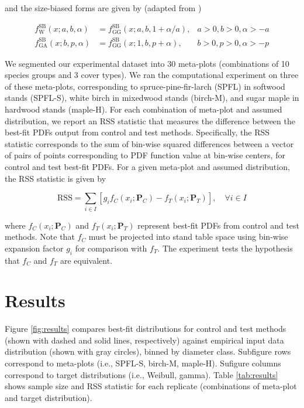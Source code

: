 \documentclass{foresj}
\begin{document}
and the size-biased forms are given by (adapted from \citealp{ducey2015sizebiased})

\begin{align}
f^{\text{SB}}_{\text{W}}(x; a, b, \alpha) &= f^{\text{SB}}_{\text{GG}}(x; a, b, 1 + \alpha/a),& a > 0, b > 0, \alpha > -a \\
f^{\text{SB}}_{\text{GA}}(x; b, p, \alpha) &= f^{\text{SB}}_{\text{GG}}(x; 1, b, p + \alpha),& b > 0, p > 0, \alpha > -p 
\end{align}

We segmented our experimental dataset into 30 meta-plots (combinations
of 10 species groups and 3 cover types).
We ran the computational
experiment on three of these meta-plots, corresponding to
spruce-pine-fir-larch (SPFL) in softwood stands (SPFL-S), white birch
in mixedwood stands (birch-M), and sugar maple in hardwood stands
(maple-H).
For each combination of meta-plot and assumed distribution, we report
an RSS statistic that measures the difference between the best-fit
PDFs output from  control and test methods.
Specifically, the RSS statistic corresponds to the sum of bin-wise squared differences
between a vector of pairs of points corresponding to PDF function
value at bin-wise centers, for control and test best-fit
PDFs.
For a given meta-plot and assumed distribution, the RSS statistic is
given by

\begin{equation}
  \text{RSS} = \sum_{i \in I}\left[g_i f_C(x_i; \bm{P}_C) - f_T(x_i; \bm{P}_T)  \right], \quad \forall i \in I
\end{equation}

where $f_C(x_i; \bm{P}_C)$ and $f_T(x_i; \bm{P}_T)$ represent best-fit
PDFs from control and test methods.
Note that $f_C$ must be projected into stand table space using
bin-wise expansion factor $g_i$ for comparison with $f_T$. 
The experiment tests the hypothesis that $f_C$ and $f_T$ are
equivalent. 

\section{Results}
\label{sec:results}

Figure \ref{fig:results} compares best-fit distributions for control
and test methods (shown with dashed and solid lines, respectively) against empirical input data distribution (shown with gray circles), binned by
diameter class.
  Subfigure rows correspond to meta-plots (i.e., SPFL-S, birch-M, maple-H).
  Sufigure columns correspond to target distributions (i.e., Weibull, gamma).
  Table \ref{tab:results} shows sample size and RSS statistic for each
  replicate (combinations of meta-plot and target distribution). 
\end{document}
